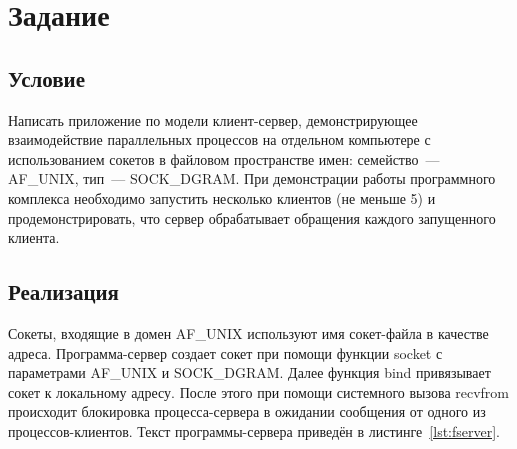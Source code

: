 \chapter{Задание }

\section{Условие}

Написать приложение по модели клиент-сервер, демонстрирующее взаимодействие параллельных процессов на отдельном компьютере с использованием сокетов в файловом пространстве имен: семейство~--- AF\_UNIX, тип~--- SOCK\_DGRAM\@. При демонстрации работы программного комплекса необходимо запустить несколько клиентов (не меньше 5) и продемонстрировать, что сервер обрабатывает обращения каждого запущенного клиента.

\section{Реализация}

Сокеты, входящие в домен AF\_UNIX используют имя сокет-файла в качестве адреса. Программа-сервер создает сокет при помощи функции socket с параметрами AF\_UNIX и SOCK\_DGRAM\@. Далее функция bind привязывает сокет к локальному адресу. После этого при помощи системного вызова recvfrom происходит блокировка процесса-сервера в ожидании сообщения от одного из процессов-клиентов. Текст программы-сервера приведён в листинге~\ref{lst:fserver}.

